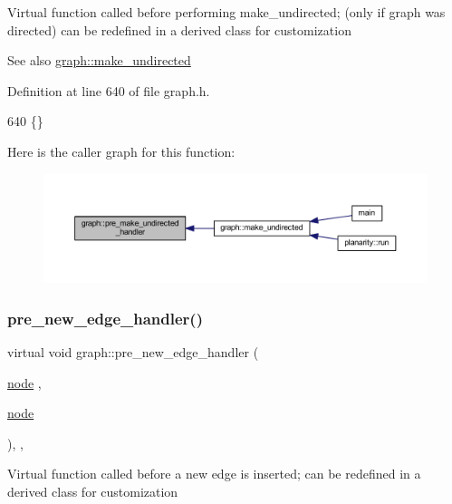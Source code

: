 Virtual function called before performing make\+\_\+undirected; (only if graph was directed) can be redefined in a derived class for customization

\begin{DoxySeeAlso}{See also}
\mbox{\hyperlink{classgraph_a31c8b895bd842f1b9dcc67649956cfc7}{graph\+::make\+\_\+undirected}} 
\end{DoxySeeAlso}


Definition at line 640 of file graph.\+h.


\begin{DoxyCode}
640 \{\}
\end{DoxyCode}
Here is the caller graph for this function\+:
\nopagebreak
\begin{figure}[H]
\begin{center}
\leavevmode
\includegraphics[width=350pt]{classgraph_a8964107991e6f411ba8992f6b1deda21_icgraph}
\end{center}
\end{figure}
\mbox{\label{classgraph_a0a7a68fa0baa47ef955525c445fa1a04}} 
\subsubsection{\texorpdfstring{pre\+\_\+new\+\_\+edge\+\_\+handler()}{pre\_new\_edge\_handler()}}
{\footnotesize\ttfamily virtual void graph\+::pre\+\_\+new\+\_\+edge\+\_\+handler (\begin{DoxyParamCaption}\item[{\mbox{\hyperlink{classnode}{node}}}]{,  }\item[{\mbox{\hyperlink{classnode}{node}}}]{ }\end{DoxyParamCaption})\hspace{0.3cm}{\ttfamily [inline]}, {\ttfamily [virtual]}, {\ttfamily [inherited]}}

Virtual function called before a new edge is inserted; can be redefined in a derived class for customization


